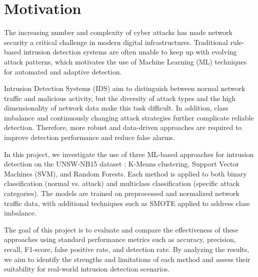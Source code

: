\section{Motivation}
The increasing number and complexity of cyber attacks has made network security a critical challenge in modern digital infrastructures. Traditional rule-based intrusion detection systems are often unable to keep up with evolving attack patterns, which motivates the use of Machine Learning (ML) techniques for automated and adaptive detection.

\nextparagraph
Intrusion Detection Systems (IDS) aim to distinguish between normal network traffic and malicious activity, but the diversity of attack types and the high dimensionality of network data make this task difficult. In addition, class imbalance and continuously changing attack strategies further complicate reliable detection. Therefore, more robust and data-driven approaches are required to improve detection performance and reduce false alarms.

\nextparagraph
In this project, we investigate the use of three ML-based approaches for intrusion detection on the UNSW-NB15 dataset \cite{UNSW}: K-Means clustering\cite{kMeans}, Support Vector Machines (SVM)\cite{SVM}, and Random Forests\cite{intrusion_detection_combined_random_forest}. Each method is applied to both binary classification (normal vs. attack) and multiclass classification (specific attack categories). The models are trained on preprocessed and normalized network traffic data, with additional techniques such as SMOTE applied to address class imbalance.

\nextparagraph
The goal of this project is to evaluate and compare the effectiveness of these approaches using standard performance metrics such as accuracy, precision, recall, F1-score, false positive rate, and detection rate. By analyzing the results, we aim to identify the strengths and limitations of each method and assess their suitability for real-world intrusion detection scenarios.